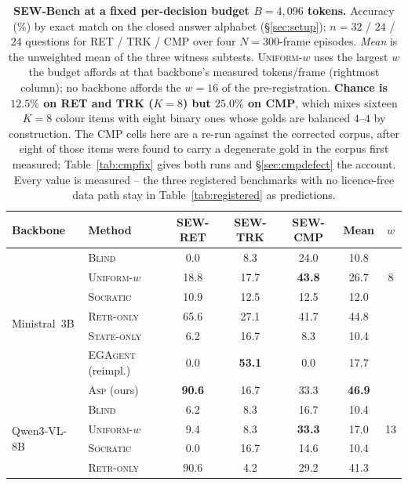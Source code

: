 \documentclass[10pt]{article}
\theoremstyle{definition}
\theoremstyle{plain}
\newcommand{\ASP}{\textsc{Asp}}
\begin{document}
\begin{table}[!htbp]
\centering\footnotesize\setlength{\tabcolsep}{5pt}
\caption{\textbf{SEW-Bench at a fixed per-decision budget $B{=}4{,}096$ tokens.} Accuracy (\%) by exact match on the closed answer alphabet (\S\ref{sec:setup}); $n{=}32$ / $24$ / $24$ questions for RET / TRK / CMP over four $N{=}300$-frame episodes. \emph{Mean} is the unweighted mean of the three witness subtests. \textsc{Uniform-}$w$ uses the largest $w$ the budget affords at that backbone's measured tokens/frame (rightmost column); no backbone affords the $w{=}16$ of the pre-registration. \textbf{Chance is $12.5\%$ on RET and TRK ($K{=}8$) but $25.0\%$ on CMP}, which mixes sixteen $K{=}8$ colour items with eight binary ones whose golds are balanced $4$--$4$ by construction. The CMP cells here are a re-run against the corrected corpus, after eight of those items were found to carry a degenerate gold in the corpus first measured; Table~\ref{tab:cmpfix} gives both runs and \S\ref{sec:cmpdefect} the account. Every value is measured -- the three registered benchmarks with no licence-free data path stay in Table~\ref{tab:registered} as predictions.}
\label{tab:main}
\begin{tabular}{llcccc@{\hskip 10pt}c}
\toprule
Backbone & Method & SEW-RET & SEW-TRK & SEW-CMP & Mean & $w$ \\
\midrule
\multirow{7}{*}{Ministral~3B}
 & \textsc{Blind} & 0.0 & 8.3 & 24.0 & 10.8 &  \\
 & \textsc{Uniform-}$w$ & 18.8 & 17.7 & \textbf{43.8} & 26.7 & 8 \\
 & \textsc{Socratic} & 10.9 & 12.5 & 12.5 & 12.0 &  \\
 & \textsc{Retr-only} & 65.6 & 27.1 & 41.7 & 44.8 &  \\
 & \textsc{State-only} & 6.2 & 16.7 & 8.3 & 10.4 &  \\
 & \textsc{EGAgent} (reimpl.) & 0.0 & \textbf{53.1} & 0.0 & 17.7 &  \\
 & \ASP{} (ours) & \textbf{90.6} & 16.7 & 33.3 & \textbf{46.9} &  \\
\midrule
\multirow{7}{*}{Qwen3-VL-8B}
 & \textsc{Blind} & 6.2 & 8.3 & 16.7 & 10.4 &  \\
 & \textsc{Uniform-}$w$ & 9.4 & 8.3 & \textbf{33.3} & 17.0 & 13 \\
 & \textsc{Socratic} & 0.0 & 16.7 & 14.6 & 10.4 &  \\
 & \textsc{Retr-only} & 90.6 & 4.2 & 29.2 & 41.3 &  \\

\end{tabular}
\end{table}
\end{document}
